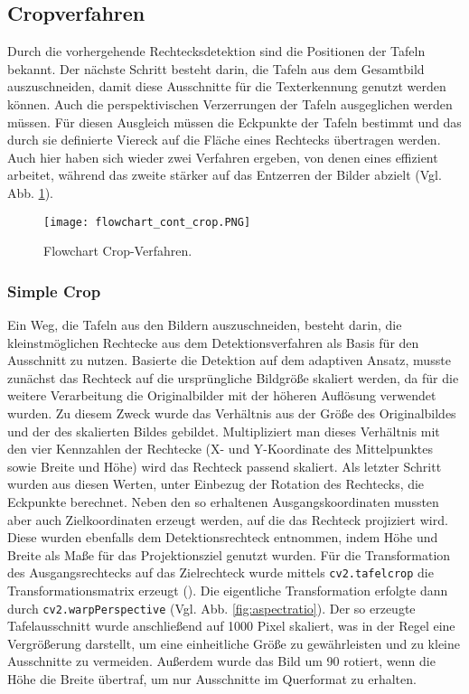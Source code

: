 \subsection{Cropverfahren}

Durch die vorhergehende Rechtecksdetektion sind die Positionen der Tafeln bekannt. Der nächste Schritt besteht darin, die Tafeln aus dem Gesamtbild auszuschneiden, damit diese Ausschnitte für die Texterkennung genutzt werden können. Auch die perspektivischen Verzerrungen der Tafeln ausgeglichen werden müssen. Für diesen Ausgleich müssen die Eckpunkte der Tafeln bestimmt und das durch sie definierte Viereck auf die Fläche eines Rechtecks übertragen werden.
Auch hier haben sich wieder zwei Verfahren ergeben, von denen eines effizient arbeitet, während das zweite stärker auf das Entzerren der Bilder abzielt (Vgl. Abb. \ref{fig:flowchartcrop}).
\begin{figure}[h!]
\centering
\texttt{[image: flowchart\_cont\_crop.PNG]}
\caption{Flowchart Crop-Verfahren.}
\label{fig:flowchartcrop}
\end{figure}

\subsubsection{Simple Crop}

Ein Weg, die Tafeln aus den Bildern auszuschneiden, besteht darin, die kleinstmöglichen Rechtecke aus dem Detektionsverfahren als Basis für den Ausschnitt zu nutzen. Basierte die Detektion auf dem adaptiven Ansatz, musste zunächst das Rechteck auf die ursprüngliche Bildgröße skaliert werden, da für die weitere Verarbeitung die Originalbilder mit der höheren Auflösung verwendet wurden. Zu diesem Zweck wurde das Verhältnis aus der Größe des Originalbildes und der des skalierten Bildes gebildet. Multipliziert man dieses Verhältnis mit den vier Kennzahlen der Rechtecke (X- und Y-Koordinate des Mittelpunktes sowie Breite und Höhe) wird das Rechteck passend skaliert. Als letzter Schritt wurden aus diesen Werten, unter Einbezug der Rotation des Rechtecks, die Eckpunkte berechnet.  Neben den so erhaltenen Ausgangskoordinaten mussten aber auch Zielkoordinaten erzeugt werden, auf die das Rechteck projiziert wird. Diese wurden ebenfalls dem Detektionsrechteck entnommen, indem Höhe und Breite als Maße für das Projektionsziel genutzt wurden.
Für die Transformation des Ausgangsrechtecks auf das Zielrechteck wurde mittels \verb|cv2.tafelcrop| die Transformationsmatrix erzeugt (\cite{cvtransform}). Die eigentliche Transformation erfolgte dann durch \verb|cv2.warpPerspective| (Vgl. Abb. \ref{fig:aspectratio}).
Der so erzeugte Tafelausschnitt wurde anschließend auf 1000 Pixel skaliert, was in der Regel eine Vergrößerung darstellt, um eine einheitliche Größe zu gewährleisten und zu kleine Ausschnitte zu vermeiden. Außerdem wurde das Bild um 90 \degree rotiert, wenn die Höhe die Breite übertraf, um nur Ausschnitte im Querformat zu erhalten.

